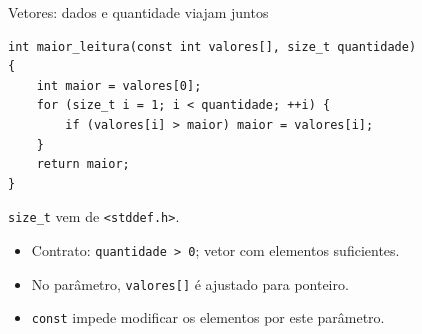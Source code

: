 \begin{frame}[fragile]{Vetores: dados e quantidade viajam juntos}
\begin{lstlisting}
int maior_leitura(const int valores[], size_t quantidade)
{
    int maior = valores[0];
    for (size_t i = 1; i < quantidade; ++i) {
        if (valores[i] > maior) maior = valores[i];
    }
    return maior;
}
\end{lstlisting}
\small \texttt{size\_t} vem de \texttt{<stddef.h>}.
\begin{itemize}
\item Contrato: \texttt{quantidade > 0}; vetor com elementos suficientes.
\item No parâmetro, \texttt{valores[]} é ajustado para ponteiro.
\item \texttt{const} impede modificar os elementos por este parâmetro.
\end{itemize}
\end{frame}

